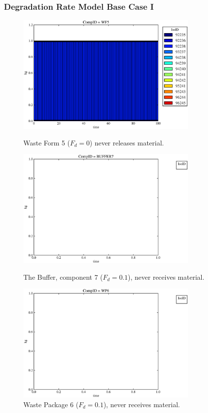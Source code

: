 \begin{frame}
  \frametitle{Degradation Rate Model Base Case I}
  \begin{figure}

\begin{minipage}[b]{0.45\linewidth}

  \includegraphics[width=0.8\textwidth]{./images/drI1.eps}
  \caption[DRI Waste Form Contaminants.]{
    Waste Form 5 ($F_d = 0$) never releases material.
    }
  \label{fig:drIwf5}
  
  \includegraphics[width=0.8\textwidth]{./images/drI3.eps}
  \caption[Case DRI Buffer Contaminants]{
    The Buffer, component 7 ($F_d = 0.1$), never receives material.
    }
  \label{fig:drIbuff}

\end{minipage}
\hspace{0.05\linewidth}
\begin{minipage}[b]{0.45\linewidth}
  \includegraphics[width=0.8\textwidth]{./images/drI2.eps}
  \caption[Case DRI Waste Package Contaminants.]{ 
    Waste Package 6 ($F_d = 0.1$), never receives material.
    }
  \label{fig:drIwp6}


\end{minipage}
\end{figure}
\end{frame}
